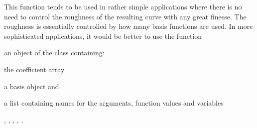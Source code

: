 \begin{Details}\relax
This function tends to be used in rather simple applications where
there is no need to control the roughness of the resulting curve
with any great finesse.  The roughness is essentially controlled
by how many basis functions are used.  In more sophisticated
applications, it would be better to use the function 
\end{Details}
\begin{Value}
an object of the  class containing:

\begin{ldescription}
\item[\code{coefs}] the coefficient array

\item[\code{basis}] a basis object and

\item[\code{fdnames}] a list containing names for the arguments, function values
and variables

\end{ldescription}
\end{Value}
\begin{SeeAlso}\relax
{}
, 
, 
, 
, 
, 
\end{SeeAlso}
